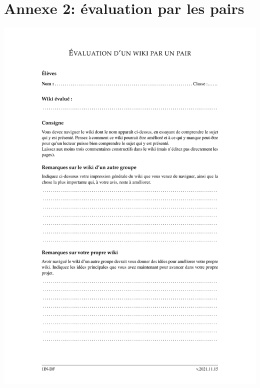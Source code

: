 \documentclass[11pt,bibliography=totoc]{scrartcl}
\begin{document}
\section*{Annexe 2: évaluation par les pairs} %
\includegraphics[width=.95\textwidth]{annexes/pairs.pdf}
\end{document}
